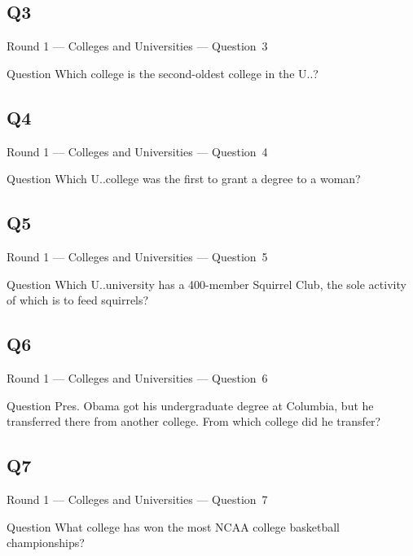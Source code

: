 \documentclass[11pt]{beamer}
\begin{document}
\subsection*{Q3}
\begin{frame}[t]{Round 1 --- Colleges and Universities --- \mbox{Question 3}}
\vspace{-0.5em}
\begin{block}{Question}
Which college is the second-oldest college in the U.\@S.\@?
\end{block}
\end{frame}
\subsection*{Q4}
\begin{frame}[t]{Round 1 --- Colleges and Universities --- \mbox{Question 4}}
\vspace{-0.5em}
\begin{block}{Question}
Which U.\@S.\@ college was the first to grant a degree to a woman?
\end{block}
\end{frame}
\subsection*{Q5}
\begin{frame}[t]{Round 1 --- Colleges and Universities --- \mbox{Question 5}}
\vspace{-0.5em}
\begin{block}{Question}
Which U.\@S.\@ university  has a 400-member Squirrel Club, the sole activity of which is to feed squirrels?
\end{block}
\end{frame}
\subsection*{Q6}
\begin{frame}[t]{Round 1 --- Colleges and Universities --- \mbox{Question 6}}
\vspace{-0.5em}
\begin{block}{Question}
Pres. Obama got his undergraduate degree at Columbia, but he transferred there from another college. From which college did he transfer?
\end{block}
\end{frame}
\subsection*{Q7}
\begin{frame}[t]{Round 1 --- Colleges and Universities --- \mbox{Question 7}}
\vspace{-0.5em}
\begin{block}{Question}
What college has won the most NCAA college basketball championships?
\end{block}
\end{frame}
\end{document}
